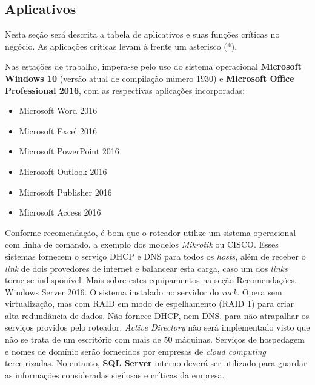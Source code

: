 \documentclass[	DIV=calc,%
							paper=a4,%
							fontsize=12pt,%
							onecolumn]{scrartcl}	 					%
\begin{document}
\subsection{Aplicativos}

Nesta seção será descrita a tabela de aplicativos e suas funções críticas no negócio. As aplicações críticas levam à frente um asterisco (*).







Nas estações de trabalho, impera-se pelo uso do sistema operacional \textbf{Microsoft Windows 10} (versão atual de compilação número 1930) e \textbf{Microsoft Office Professional 2016}, com as respectivas aplicações incorporadas: \\ 

\begin{itemize}
	\item Microsoft Word 2016 
	\item Microsoft Excel 2016
	\item Microsoft PowerPoint 2016
	\item Microsoft Outlook 2016
	\item Microsoft Publisher 2016
	\item Microsoft Access 2016
\end{itemize}



Conforme recomendação, é bom que o roteador utilize um sistema operacional com linha de comando, a exemplo dos modelos \textit{Mikrotik} ou CISCO. Esses sistemas fornecem o serviço DHCP e DNS para todos os \textit{hosts}, além de receber o \textit{link} de dois provedores de internet e balancear esta carga, caso um dos \textit{links} torne-se indisponível. Mais sobre estes equipamentos na seção {Recomendações}.
\\

Windows Server 2016. O sistema instalado no servidor do \textit{rack}. Opera sem virtualização, mas com RAID em modo de espelhamento (RAID 1) para criar alta redundância de dados. Não fornece DHCP, nem DNS, para não atrapalhar os serviços providos pelo roteador. \textit{Active Directory }não será implementado visto que não se trata de um escritório com mais de 50 máquinas. Serviços de hospedagem e nomes de domínio serão fornecidos por empresas de \textit{cloud computing} terceirizadas. No entanto, \textbf{SQL Server} interno deverá ser utilizado para guardar as informações consideradas sigilosas e críticas da empresa.
\end{document}
